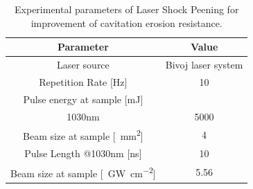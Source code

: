 \begin{table}[h!]
\centering
    \begin{threeparttable}
        \begin{tabular}{||c | c||} 
        \hline
            \textbf{Parameter} & \textbf{Value} \\ [0.5ex] 
        \hline\hline
        Laser source & Bivoj laser system  \\
        \hline
        Repetition Rate [Hz] & 10  \\ 
        \hline
            Pulse energy at sample [mJ] & \\
            1030nm & 5000 \\
        \hline
            Beam size at sample [\SI{}{\mm\squared}] & 4 \\
        \hline
            Pulse Length @1030nm [ns] & 10 \\
        \hline
            Beam size at sample [\SI{}{\giga\watt\per\cm\squared}] & 5.56 \\

        \hline
        \hline
        \end{tabular}

        \caption{Experimental parameters of Laser Shock Peening for improvement of cavitation erosion resistance.}
        \label{experimentalparameters}
    \end{threeparttable}
\end{table}

